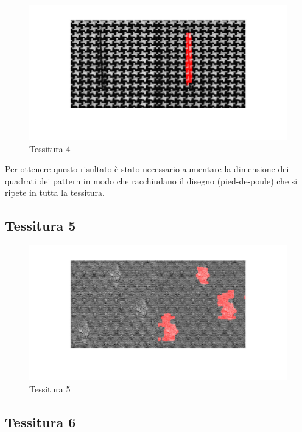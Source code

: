 \documentclass{article}
\begin{document}
\begin{figure}[h!]
	\centering
	\includegraphics[width=\textwidth]{results/res4.jpg}
	\caption{Tessitura 4}
\end{figure}

Per ottenere questo risultato è stato necessario aumentare la dimensione dei quadrati dei pattern
in modo che racchiudano il disegno (pied-de-poule) che si ripete in tutta la tessitura.

\subsection{Tessitura 5}

\begin{figure}[h!]
	\centering
	\includegraphics[width=\textwidth]{results/res5.jpg}
	\caption{Tessitura 5}
\end{figure}

\subsection{Tessitura 6}
\end{document}
